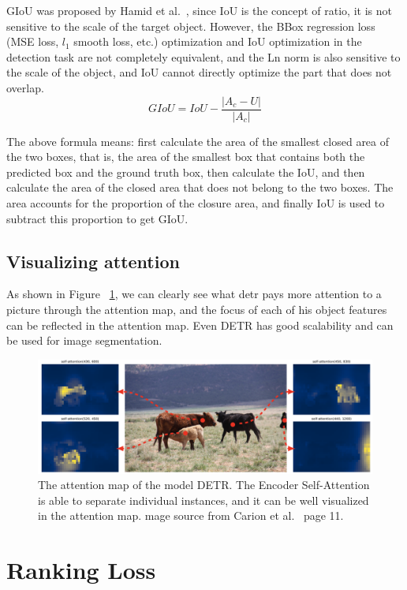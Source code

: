 GIoU was proposed by Hamid et al.~\cite{rezatofighi2019generalized}, since IoU is the concept of ratio, it is not sensitive to the scale of the target object. However, the BBox regression loss (MSE loss, $ l_1 $ smooth loss, etc.) optimization and IoU optimization in the detection task are not completely equivalent, and the Ln norm is also sensitive to the scale of the object, and IoU cannot directly optimize the part that does not overlap.
$$
G I o U=I o U-\frac{\left|A_{c}-U\right|}{\left|A_{c}\right|}
$$

The above formula means: first calculate the area of the smallest closed area of the two boxes, that is, the area of the smallest box that contains both the predicted box and the ground truth box, then calculate the IoU, and then calculate the area of the closed area that does not belong to the two boxes. The area accounts for the proportion of the closure area, and finally IoU is used to subtract this proportion to get GIoU.


\subsection{Visualizing attention}
As shown in Figure ~\ref{fig:detrattentionmap}, we can clearly see what detr pays more attention to a picture through the attention map, and the focus of each of his object features can be reflected in the attention map. Even DETR has good scalability and can be used for image segmentation.

\begin{figure}
	\centering
	\includegraphics[width=1\linewidth]{figures/detr_attention_map}
	\caption[The attention map of the model DETR]{The attention map of the model DETR. The Encoder Self-Attention is able to separate individual instances, and it can be well visualized in the attention map. mage source from Carion et al.~\cite{carion2020end} page 11.}
	\label{fig:detrattentionmap}
\end{figure}




\section{Ranking Loss}

